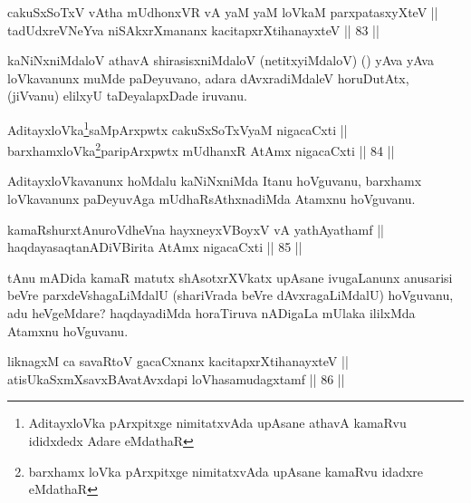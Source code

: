
\begin{shl}
cakuSxSoTxV vA\s tha mUdhonxVR vA yaM yaM loVkaM parxpatasxyXteV || \\
tadUdxreVNeYva niSAkxrXmananx kacitapxrXtihanayxteV \hfill || 83 ||  
\end{shl}

\begin{artha}
kaNiNxniMdaloV athavA shirasisxniMdaloV (netitxyiMdaloV) (\quad) yAva
yAva loVkavanunx muMde paDeyuvano, adara dAvxradiMdaleV horuDutAtx,
(jiVvanu) elilxyU taDeyalapxDade iruvanu.
\end{artha}


\begin{shl}
AditayxloVka\footnote{AditayxloVka pArxpitxge nimitatxvAda upAsane athavA kamaRvu
ididxdedx Adare eMdathaR}saMpArxpwtx cakuSxSoTxV\s yaM nigacaCxti || \\
barxhamxloVka\footnote{barxhamx loVka pArxpitxge nimitatxvAda upAsane kamaRvu idadxre eMdathaR}paripArxpwtx mUdhanxR AtAmx nigacaCxti \hfill || 84 ||  
\end{shl}


\begin{artha}
AditayxloVkavanunx hoMdalu kaNiNxniMda Itanu
hoVguvanu, barxhamx loVkavanunx paDeyuvAga mUdhaRsAthxnadiMda Atamxnu
hoVguvanu.
\end{artha}


	
\begin{shl}
kamaRshurxtAnuroVdheVna hayxneyxVBoyxV vA yathAyathamf || \\
haqdayasaqtanADiVBirita AtAmx nigacaCxti \hfill || 85 ||   
\end{shl}

\begin{artha}
tAnu mADida kamaR matutx shAsotxrXVkatx upAsane ivugaLanunx anusarisi
beVre parxdeVshagaLiMdalU (shariVrada beVre dAvxragaLiMdalU)
hoVguvanu, adu heVgeMdare? haqdayadiMda horaTiruva nADigaLa mUlaka
ililxMda Atamxnu hoVguvanu.
\end{artha}


\begin{shl}
liknagxM ca savaRtoV gacaCxnanx kacitapxrXtihanayxteV || \\
atisUkaSxmXsavxBAvatAvxdapi loVhasamudagxtamf \hfill || 86 ||  
\end{shl}


